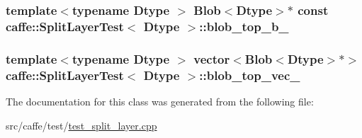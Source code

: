 \hypertarget{classcaffe_1_1_split_layer_test_a84fac4db116cd72b0f1c05fda18bb25f}{
\subsubsection[{blob\+\_\+top\+\_\+b\+\_\+}]{\setlength{\rightskip}{0pt plus 5cm}template$<$typename Dtype $>$ {\bf Blob}$<$Dtype$>$$\ast$ const {\bf caffe\+::\+Split\+Layer\+Test}$<$ Dtype $>$\+::blob\+\_\+top\+\_\+b\+\_\+\hspace{0.3cm}{\ttfamily [protected]}}}\label{classcaffe_1_1_split_layer_test_a84fac4db116cd72b0f1c05fda18bb25f}
\hypertarget{classcaffe_1_1_split_layer_test_ac9d579b35358fc576093dd62395d683c}{
\subsubsection[{blob\+\_\+top\+\_\+vec\+\_\+}]{\setlength{\rightskip}{0pt plus 5cm}template$<$typename Dtype $>$ vector$<${\bf Blob}$<$Dtype$>$$\ast$$>$ {\bf caffe\+::\+Split\+Layer\+Test}$<$ Dtype $>$\+::blob\+\_\+top\+\_\+vec\+\_\+\hspace{0.3cm}{\ttfamily [protected]}}}\label{classcaffe_1_1_split_layer_test_ac9d579b35358fc576093dd62395d683c}


The documentation for this class was generated from the following file\+:\begin{DoxyCompactItemize}
\item 
src/caffe/test/\hyperlink{test__split__layer_8cpp}{test\+\_\+split\+\_\+layer.\+cpp}\end{DoxyCompactItemize}
